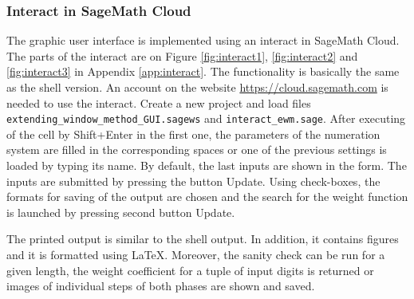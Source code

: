 \begin{upravit}
\subsubsection{Interact in SageMath Cloud}
The graphic user interface is implemented using an interact in SageMath Cloud. The parts of the interact are on Figure \ref{fig:interact1}, \ref{fig:interact2} and \ref{fig:interact3} in Appendix \ref{app:interact}. The functionality is basically the same as the shell version. An account on the website \url{https://cloud.sagemath.com} is needed to use the interact. Create a new project and load files \verb+extending_window_method_GUI.sagews+ and \verb+interact_ewm.sage+. After executing of the cell by Shift+Enter in the first one, the parameters of the numeration system are filled in the corresponding spaces or one of the previous settings is loaded by typing its name.  By default, the last inputs are shown in the form. The inputs are submitted by pressing the button Update. Using check-boxes, the formats for saving of the output are chosen and the search for the weight function is launched by pressing second button Update.

The printed output is similar to the shell output. In addition, it contains figures and it is formatted using \LaTeX. Moreover, the sanity check can be run for a given length, the weight coefficient for a tuple of  input digits is returned or images of individual steps of both phases are shown and saved.


\end{upravit}